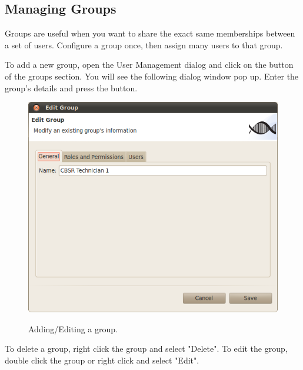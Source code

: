 \newpage
\subsection{Managing Groups}
Groups are useful when you want to share the exact same memberships between a set of users.
Configure a group once, then assign many users to that group.

To add a new group, open the User Management dialog and click on the \fbox{+} button
of the groups section. You will see the following dialog window pop up. Enter the group's
details and press the  button.
\begin{figure}[H]
  \centering
  \scalebox{0.5}
	   { \includegraphics*{screenshots/administration/edit_group_general} }
	   \caption{Adding/Editing a group.}
	   \label{fig:add_group}
\end{figure}

To delete a group, right click the group and select "Delete". To edit the group, double click
the group or right click and select "Edit".

\newpage

